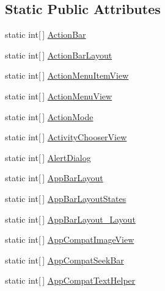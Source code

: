 \subsection*{Static Public Attributes}
\begin{CompactItemize}
\item 
static int\mbox{[}$\,$\mbox{]} \hyperlink{class__2doo_1_1_droid_1_1_resource_1_1_styleable_565594acc9f8b831913b54b310db27f1}{ActionBar}
\item 
static int\mbox{[}$\,$\mbox{]} \hyperlink{class__2doo_1_1_droid_1_1_resource_1_1_styleable_bedc6361b06eb7a67bfe08ba2311517c}{ActionBarLayout}
\item 
static int\mbox{[}$\,$\mbox{]} \hyperlink{class__2doo_1_1_droid_1_1_resource_1_1_styleable_e077d3be702fe927951e38340a8e8f7c}{ActionMenuItemView}
\item 
static int\mbox{[}$\,$\mbox{]} \hyperlink{class__2doo_1_1_droid_1_1_resource_1_1_styleable_89d93022ff0483ccff9309186df4e1bb}{ActionMenuView}
\item 
static int\mbox{[}$\,$\mbox{]} \hyperlink{class__2doo_1_1_droid_1_1_resource_1_1_styleable_84b41a0b766f36a87cbf0e180332e4c1}{ActionMode}
\item 
static int\mbox{[}$\,$\mbox{]} \hyperlink{class__2doo_1_1_droid_1_1_resource_1_1_styleable_1527d32d8ae0549a362ea39f67b08863}{ActivityChooserView}
\item 
static int\mbox{[}$\,$\mbox{]} \hyperlink{class__2doo_1_1_droid_1_1_resource_1_1_styleable_323e6663bc62326c0df7d18a1fe9b215}{AlertDialog}
\item 
static int\mbox{[}$\,$\mbox{]} \hyperlink{class__2doo_1_1_droid_1_1_resource_1_1_styleable_92ea3e75b72b89963b87a937e4d0d984}{AppBarLayout}
\item 
static int\mbox{[}$\,$\mbox{]} \hyperlink{class__2doo_1_1_droid_1_1_resource_1_1_styleable_ebf3c84859c87e5ffc12fd92cb0c33c7}{AppBarLayoutStates}
\item 
static int\mbox{[}$\,$\mbox{]} \hyperlink{class__2doo_1_1_droid_1_1_resource_1_1_styleable_667d000fa20573da822e030bd1c5e2f8}{AppBarLayout\_\-Layout}
\item 
static int\mbox{[}$\,$\mbox{]} \hyperlink{class__2doo_1_1_droid_1_1_resource_1_1_styleable_8accdf58dd9cdb4860801d5ff3720f5c}{AppCompatImageView}
\item 
static int\mbox{[}$\,$\mbox{]} \hyperlink{class__2doo_1_1_droid_1_1_resource_1_1_styleable_8cbf4e81e484786857af81c19bd5f2d1}{AppCompatSeekBar}
\item 
static int\mbox{[}$\,$\mbox{]} \hyperlink{class__2doo_1_1_droid_1_1_resource_1_1_styleable_5be08abc48b1d0dead4db2ff4fbe9a1c}{AppCompatTextHelper}

\end{CompactItemize}
